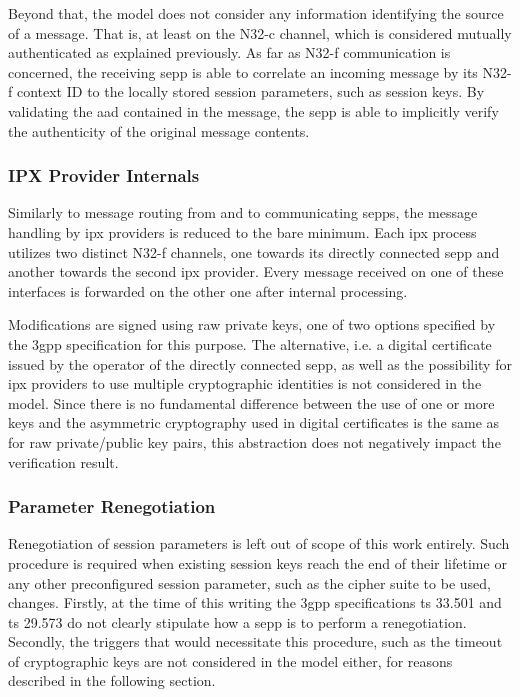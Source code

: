Beyond that, the model does not consider any information identifying the source of a message.
That is, at least on the N32-c channel, which is considered mutually authenticated as explained previously.
As far as N32-f communication is concerned, the receiving \gls{sepp} is able to correlate an incoming message by its N32-f context ID to the locally stored session parameters, such as session keys.
By validating the \gls{aad} contained in the message, the \gls{sepp} is able to implicitly verify the authenticity of the original message contents.

\subsubsection{IPX Provider Internals}

Similarly to message routing from and to communicating \glspl{sepp}, the message handling by \gls{ipx} providers is reduced to the bare minimum.
Each \gls{ipx} process utilizes two distinct N32-f channels, one towards its directly connected \gls{sepp} and another towards the second \gls{ipx} provider.
Every message received on one of these interfaces is forwarded on the other one after internal processing.

Modifications are signed using raw private keys, one of two options specified by the \gls{3gpp} specification for this purpose.
The alternative, i.e. a digital certificate issued by the operator of the directly connected \gls{sepp}, as well as the possibility for \gls{ipx} providers to use multiple cryptographic identities is not considered in the model.
Since there is no fundamental difference between the use of one or more keys and the asymmetric cryptography used in digital certificates is the same as for raw private/public key pairs, this abstraction does not negatively impact the verification result.

\subsubsection{Parameter Renegotiation}

Renegotiation of session parameters is left out of scope of this work entirely.
Such procedure is required when existing session keys reach the end of their lifetime or any other preconfigured session parameter, such as the cipher suite to be used, changes.
Firstly, at the time of this writing the \gls{3gpp} specifications \gls{ts} 33.501 and \gls{ts} 29.573 do not clearly stipulate how a \gls{sepp} is to perform a renegotiation.
Secondly, the triggers that would necessitate this procedure, such as the timeout of cryptographic keys are not considered in the model either, for reasons described in the following section.

